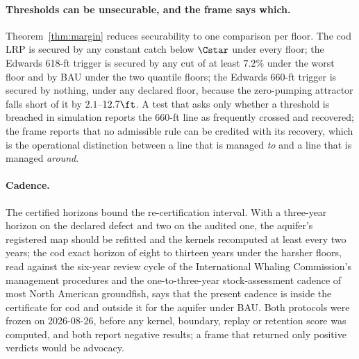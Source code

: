 \paragraph{Thresholds can be unsecurable, and the frame says which.}
Theorem~\ref{thm:margin} reduces securability to one comparison per floor. The cod LRP is secured by any constant catch below $\Cstar$ under every floor; the Edwards 618-ft trigger is secured by any cut of at least $7.2\%$ under the worst floor and by BAU under the two quantile floors; the Edwards 660-ft trigger is secured by nothing, under any declared floor, because the zero-pumping attractor falls short of it by $2.1$--$12.7\ft$. A test that asks only whether a threshold is breached in simulation reports the 660-ft line as frequently crossed and recovered; the frame reports that no admissible rule can be credited with its recovery, which is the operational distinction between a line that is managed \emph{to} and a line that is managed \emph{around}.

\paragraph{Cadence.}
The certified horizons bound the re-certification interval. With a three-year horizon on the declared defect and two on the audited one, the aquifer's registered map should be refitted and the kernels recomputed at least every two years; the cod exact horizon of eight to thirteen years under the harsher floors, read against the six-year review cycle of the International Whaling Commission's management procedures and the one-to-three-year stock-assessment cadence of most North American groundfish, says that the present cadence is inside the certificate for cod and outside it for the aquifer under BAU. Both protocols were frozen on 2026-08-26, before any kernel, boundary, replay or retention score was computed, and both report negative results; a frame that returned only positive verdicts would be advocacy.
